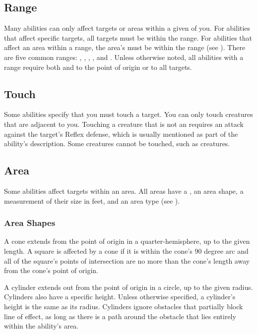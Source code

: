     \subsection{Range}\label{Range}
        Many abilities can only affect targets or areas within a given  of you.
        For abilities that affect specific targets, all targets must be within the range.
        For abilities that affect an area within a range, the area's  must be within the range (see ).
        There are five common ranges: \shortrange, \medrange, \longrange, \distrange, and \extrange.
        Unless otherwise noted, all abilities with a range require both  and  to the point of origin or to all targets.

    \subsection{Touch}\label{Touch}
        Some abilities specify that you must touch a target.
        You can only touch creatures that are adjacent to you.
        Touching a creature that is not an  requires an attack against the target's Reflex defense, which is usually mentioned as part of the ability's description.
        Some creatures cannot be touched, such as  creatures.

    \subsection{Area}\label{Area}

        Some abilities affect targets within an area.
        All areas have a , an area shape, a measurement of their size in feet, and an area type (see ).

        \subsubsection{Area Shapes}\label{Area Shapes}

             A cone extends from the point of origin in a quarter-hemisphere, up to the given length.
            A square is affected by a cone if it is within the cone's 90 degree arc and all of the square's points of intersection are no more than the cone's length away from the cone's point of origin.

             A cylinder extends out from the point of origin in a circle, up to the given radius.
            Cylinders also have a specific height.
            Unless otherwise specified, a cylinder's height is the same as its radius.
            Cylinders ignore obstacles that partially block line of effect, as long as there is a path around the obstacle that lies entirely within the ability's area.

